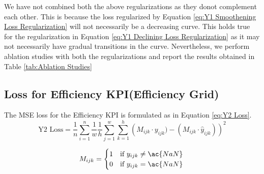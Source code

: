 \documentclass{report} %
\begin{document}
\begin{enumerate}

\end{enumerate}

We have not combined both the above regularizations as they donot complement each other. This is because the loss regularized by Equation \ref{eq:Y1 Smoothening Loss Regularization} will not necessarily be a decreasing curve.
This holds true for the regularization in Equation \ref{eq:Y1 Declining Loss Regularization} as it may not necessarily have gradual transitions in the curve.
Nevertheless, we perform ablation studies with both the regularizations and report the results obtained in Table \ref{tab:Ablation Studies}

\subsection{Loss for Efficiency \ac{KPI}(Efficiency Grid)}\label{sec:Loss for 3D KPI}

The \ac{MSE} loss for the Efficiency \ac{KPI} is formulated as in Equation \ref{eq:Y2 Loss}.
\begin{equation}
\text{Y2 Loss} = \frac{1}{n} \sum_{i=1}^{n} \frac{1}{w} \frac{1}{h} \sum_{j=1}^{w} \sum_{k=1}^{h} \left( M_{ijk} \cdot y_{ijk}) - (M_{ijk} \cdot \hat{y}_{ijk})\right)^2
\label{eq:Y2 Loss}
\end{equation}

\begin{equation}
    M_{ijk} = \begin{cases}
        1 & \text{if } y_{ijk} \neq \ac{NaN} \\
        0 & \text{if } y_{ijk} = \ac{NaN} 
        \end{cases} \\
\label{eq:Mask matrix}
\end{equation}
\end{document}
